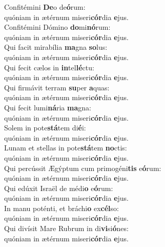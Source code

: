 \evenverse Confitémini \textbf{De}o de\textbf{ó}rum:~\*\\
\evenverse quóniam in ætérnum miseri\textbf{cór}dia \textbf{e}jus.\\
\oddverse Confitémini Dómino \textbf{do}mi\textbf{nó}rum:~\*\\
\oddverse quóniam in ætérnum miseri\textbf{cór}dia \textbf{e}jus.\\
\evenverse Qui facit mirabília \textbf{ma}gna \textbf{so}lus:~\*\\
\evenverse quóniam in ætérnum miseri\textbf{cór}dia \textbf{e}jus.\\
\oddverse Qui fecit cælos in \textbf{in}tel\textbf{lé}ctu:~\*\\
\oddverse quóniam in ætérnum miseri\textbf{cór}dia \textbf{e}jus.\\
\evenverse Qui firmávit terram \textbf{su}per \textbf{a}quas:~\*\\
\evenverse quóniam in ætérnum miseri\textbf{cór}dia \textbf{e}jus.\\
\oddverse Qui fecit lumi\textbf{ná}ria \textbf{ma}gna:~\*\\
\oddverse quóniam in ætérnum miseri\textbf{cór}dia \textbf{e}jus.\\
\evenverse Solem in pote\textbf{stá}tem di\textbf{é}i:~\*\\
\evenverse quóniam in ætérnum miseri\textbf{cór}dia \textbf{e}jus.\\
\oddverse Lunam et stellas in pote\textbf{stá}tem \textbf{no}ctis:~\*\\
\oddverse quóniam in ætérnum miseri\textbf{cór}dia \textbf{e}jus.\\
\evenverse Qui percússit Ægýptum cum primogéni\textbf{tis} e\textbf{ó}rum:~\*\\
\evenverse quóniam in ætérnum miseri\textbf{cór}dia \textbf{e}jus.\\
\oddverse Qui edúxit Israël de médi\textbf{o} e\textbf{ó}rum:~\*\\
\oddverse quóniam in ætérnum miseri\textbf{cór}dia \textbf{e}jus.\\
\evenverse In manu poténti, et bráchi\textbf{o} ex\textbf{cél}so:~\*\\
\evenverse quóniam in ætérnum miseri\textbf{cór}dia \textbf{e}jus.\\
\oddverse Qui divísit Mare Rubrum in di\textbf{vi}si\textbf{ó}nes:~\*\\
\oddverse quóniam in ætérnum miseri\textbf{cór}dia \textbf{e}jus.\\

